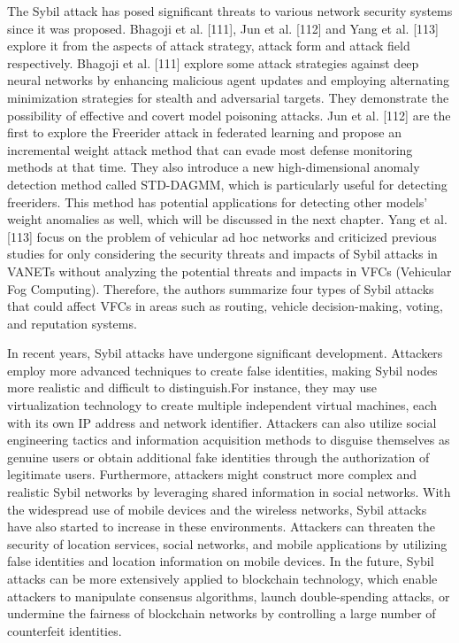 The Sybil attack has posed significant threats to various
network security systems since it was proposed. Bhagoji
et al. [111], Jun et al. [112] and Yang et al. [113] explore
it from the aspects of attack strategy, attack form and
attack field respectively. Bhagoji et al. [111] explore some
attack strategies against deep neural networks by
enhancing malicious agent updates and employing alternating
minimization strategies for stealth and adversarial targets.
They demonstrate the possibility of effective and covert
model poisoning attacks. Jun et al. [112] are the first
to explore the Freerider attack in federated learning and
propose an incremental weight attack method that can
evade most defense monitoring methods at that time. They
also introduce a new high-dimensional anomaly detection
method called STD-DAGMM, which is particularly useful
for detecting freeriders. This method has potential
applications for detecting other models' weight anomalies as well,
which will be discussed in the next chapter. Yang et al.
[113] focus on the problem of vehicular ad hoc networks
and criticized previous studies for only considering the
security threats and impacts of Sybil attacks in VANETs
without analyzing the potential threats and impacts in
VFCs (Vehicular Fog Computing). Therefore, the authors
summarize four types of Sybil attacks that could affect
VFCs in areas such as routing, vehicle decision-making,
voting, and reputation systems. 

In recent years, Sybil attacks have undergone significant
development. Attackers employ more advanced techniques
to create false identities, making Sybil nodes more realistic
and diﬀicult to distinguish.For instance, they may use
virtualization technology to create multiple independent
virtual machines, each with its own IP address and
network identifier. Attackers can also utilize social
engineering tactics and information acquisition methods to disguise
themselves as genuine users or obtain additional fake
identities through the authorization of legitimate users.
Furthermore, attackers might construct more complex and
realistic Sybil networks by leveraging shared information
in social networks. With the widespread use of mobile
devices and the wireless networks, Sybil attacks have also
started to increase in these environments. Attackers can
threaten the security of location services, social networks,
and mobile applications by utilizing false identities and
location information on mobile devices. In the future, Sybil
attacks can be more extensively applied to blockchain
technology, which enable attackers to manipulate
consensus algorithms, launch double-spending attacks, or
undermine the fairness of blockchain networks by controlling a
large number of counterfeit identities.  

